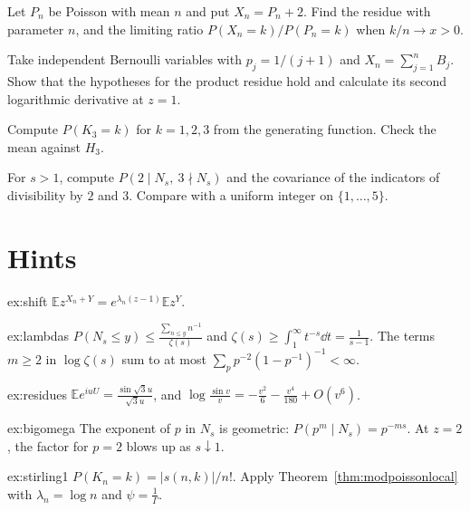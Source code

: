 \begin{exercise}[$\star$]\label{ex:v11-ch11-shifted-poisson}
Let $P_n$ be Poisson with mean $n$ and put $X_n=P_n+2$. Find the residue with parameter $n$, and the limiting ratio $P(X_n=k)/P(P_n=k)$ when $k/n\to x>0$.
\end{exercise}

\begin{exercise}[$\star\star$]\label{ex:v11-ch11-bernoulli-residue}
Take independent Bernoulli variables with $p_j=1/(j+1)$ and $X_n=\sum_{j=1}^n B_j$. Show that the hypotheses for the product residue hold and calculate its second logarithmic derivative at $z=1$.
\end{exercise}

\begin{exercise}[$\star\star$]\label{ex:v11-ch11-cycle-counts}
Compute $P(K_3=k)$ for $k=1,2,3$ from the generating function. Check the mean against $H_3$.
\end{exercise}

\begin{exercise}[$\star\star$]\label{ex:v11-ch11-dirichlet-divisibility}
For $s>1$, compute $P(2\mid N_s,\ 3\nmid N_s)$ and the covariance of the indicators of divisibility by $2$ and $3$. Compare with a uniform integer on $\{1,\dots,5\}$.
\end{exercise}

\section{Hints}

\begin{hint}{ex:shift}
$\mathbb Ez^{X_n+Y}=e^{\lambda_n(z-1)}\mathbb Ez^Y$.
\end{hint}
\begin{hint}{ex:lambdas}
$P(N_s\le y)\le\frac{\sum_{n\le y}n^{-1}}{\zeta(s)}$ and $\zeta(s)\ge\int_1^\infty t^{-s}\dd t=\frac1{s-1}$. The terms $m\ge2$ in $\log\zeta(s)$ sum to at most $\sum_pp^{-2}(1-p^{-1})^{-1}<\infty$.
\end{hint}
\begin{hint}{ex:residues}
$\mathbb Ee^{iuU}=\frac{\sin\sqrt3u}{\sqrt3u}$, and $\log\frac{\sin v}v=-\frac{v^2}6-\frac{v^4}{180}+O(v^6)$.
\end{hint}
\begin{hint}{ex:bigomega}
The exponent of $p$ in $N_s$ is geometric: $P(p^m\mid N_s)=p^{-ms}$. At $z=2$, the factor for $p=2$ blows up as $s\downarrow1$.
\end{hint}
\begin{hint}{ex:stirling1}
$P(K_n=k)=|s(n,k)|/n!$. Apply Theorem~\ref{thm:modpoissonlocal} with $\lambda_n=\log n$ and $\psi=\frac1\Gamma$.
\end{hint}

